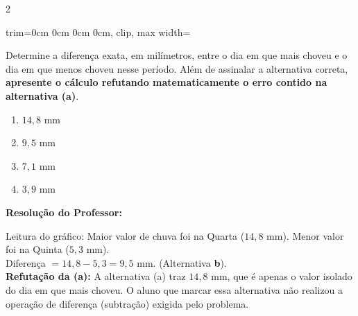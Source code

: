 \begin{multicols*}{2}
\begin{center}
\begin{adjustbox}{trim=0cm 0cm 0cm 0cm, clip, max width=\larguraTikz}
\end{adjustbox}
\end{center}
Determine a diferença exata, em milímetros, entre o dia em que mais choveu e o dia em que menos choveu nesse período. Além de assinalar a alternativa correta, \textbf{apresente o cálculo refutando matematicamente o erro contido na alternativa (a)}.
\begin{enumerate}[label=\alph*), itemsep=\espacoAlt]
    \item $ 14,8 \text{ mm} $
    \item $ 9,5 \text{ mm} $
    \item $ 7,1 \text{ mm} $
    \item $ 3,9 \text{ mm} $
\end{enumerate}

\ifgabarito
    \begin{tcolorbox}[colback=CorTitUm!5, colframe=CorTitUm, boxrule=1pt, arc=4pt, left=6pt, right=6pt, top=6pt, bottom=6pt]
    \small\textbf{\textcolor{CorTitUm}{Resolução do Professor:}}\par\vspace{0.1cm}
    \color{CinzaEscuro}
    Leitura do gráfico: Maior valor de chuva foi na Quarta ($14,8$ mm). Menor valor foi na Quinta ($5,3$ mm).\\
    Diferença $= 14,8 - 5,3 = 9,5$ mm. (Alternativa \textbf{b}).\\
    \textbf{Refutação da (a):} A alternativa (a) traz $ 14,8 $ mm, que é apenas o valor isolado do dia em que mais choveu. O aluno que marcar essa alternativa não realizou a operação de diferença (subtração) exigida pelo problema.
    \end{tcolorbox}
\fi


\end{multicols*}
